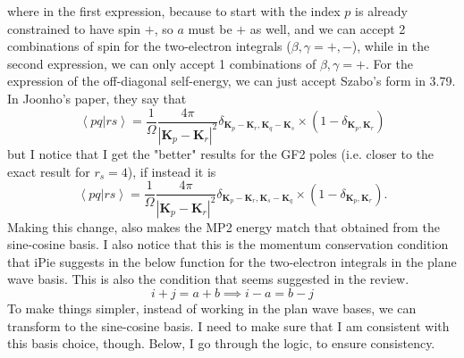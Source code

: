 where in the first expression, because to start with the index $p$ is already constrained to have spin $+$, so $a$ must be $+$ as well, and we can accept 2 combinations of spin for the two-electron integrals ($\beta , \gamma = +,-$), while in the second expression, we can only accept 1 combinations of $\beta , \gamma = +$. For the expression of the off-diagonal self-energy, we can just accept Szabo's form in 3.79.
In Joonho's paper, they say that 
\begin{equation}
\left< pq | rs \right> = \frac{1}{\Omega} \frac{4 \pi}{\left|\mathbf{K}_p-\mathbf{K}_r\right|^2} \delta_{\mathbf{K}_p-\mathbf{K}_r, \mathbf{K}_q-\mathbf{K}_s} \times\left(1-\delta_{\mathbf{K}_p , \mathbf{K}_r}\right)
\end{equation}
but I notice that I get the "better" results for the GF2 poles (i.e. closer to the exact result for $r_s=4$), if instead it is
\begin{equation}
\left< pq | rs \right> = \frac{1}{\Omega} \frac{4 \pi}{\left|\mathbf{K}_p-\mathbf{K}_r\right|^2} \delta_{\mathbf{K}_p-\mathbf{K}_r, \mathbf{K}_s-\mathbf{K}_q} \times\left(1-\delta_{\mathbf{K}_p , \mathbf{K}_r}\right).
\end{equation}
Making this change, also makes the MP2 energy match that obtained from the sine-cosine basis. I also notice that this is the momentum conservation condition that iPie suggests in the below function for the two-electron integrals in the plane wave basis. This is also the condition that seems suggested in the review. 
\newpage
\begin{equation}
    i+j=a+b \implies i-a = b - j
\end{equation}
To make things simpler, instead of working in the plan wave bases, we can transform to the sine-cosine basis. I need to make sure that I am consistent with this basis choice, though. Below, I go through the logic, to ensure consistency.


